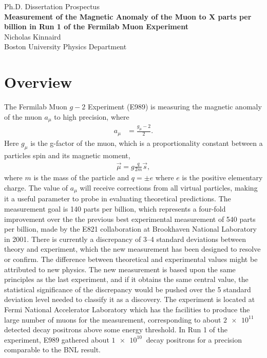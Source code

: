 \documentclass[12pt,letterpaper]{article}
\def\gmtwo{$g-2$\xspace}
\def\amu{$a_{\mu}$\xspace}
\begin{document}
\begin{center}
\Large{Ph.D. Dissertation Prospectus} \\\vspace{5mm}
\textbf{\Large{Measurement of the Magnetic Anomaly of the Muon to X parts per billion in Run 1 of the Fermilab Muon  Experiment}} \\\vspace{5mm}
\large{Nicholas Kinnaird} \\\vspace{5mm}
\large{Boston University Physics Department} \\\vspace{5mm}
\end{center}


\section*{Overview}


The Fermilab Muon \gmtwo Experiment (E989) is measuring the magnetic anomaly of the muon \amu to high precision, where  
		\begin{align}
            a_{\mu} &= \frac{g_{\mu}-2}{2}.
        \label{eq:anamoly}
		\end{align}
Here $g_{\mu}$ is the g-factor of the muon, which is a proportionality constant between a particles spin and its magnetic moment, 
		\begin{align}
            \vec{\mu} = g \frac{q}{2m} \vec{s},
        \label{eq:magneticmoment}
		\end{align}
where $m$ is the mass of the particle and $q = \pm e$ where $e$ is the positive elementary charge. The value of $a_{\mu}$ will receive corrections from all virtual particles, making it a useful parameter to probe in evaluating theoretical predictions. The measurement goal is 140 parts per billion, which represents a four-fold improvement over the the previous best experimental measurement of 540 parts per billion, made by the E821 collaboration at Brookhaven National Laboratory in 2001. There is currently a discrepancy of \SIrange{3}{4}{} standard deviations between theory and experiment, which the new measurement has been designed to resolve or confirm. The difference between theoretical and experimental values might be attributed to new physics. The new measurement is based upon the same principles as the last experiment, and if it obtains the same central value, the statistical significance of the discrepancy would be pushed over the 5 standard deviation level needed to classify it as a discovery. The experiment is located at Fermi National Accelerator Laboratory which has the facilities to produce the large number of muons for the measurement, corresponding to about $\SI{2e11}{}$ detected decay positrons above some energy threshold. In Run 1 of the experiment, E989 gathered about $\SI{1e10}{}$ decay positrons for a precision comparable to the BNL result.
\end{document}
